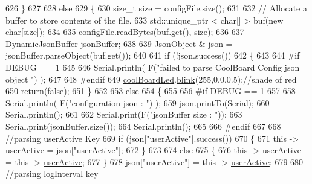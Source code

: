 \begin{DoxyCode}
626     \}
627 
628     \textcolor{keywordflow}{else}
629     \{
630         \textcolor{keywordtype}{size\_t} size = configFile.size();
631 
632         \textcolor{comment}{// Allocate a buffer to store contents of the file.}
633         std::unique\_ptr < char[] > buf(\textcolor{keyword}{new} \textcolor{keywordtype}{char}[size]);
634 
635         configFile.readBytes(buf.get(), size);
636 
637         DynamicJsonBuffer jsonBuffer;
638 
639         JsonObject & json = jsonBuffer.parseObject(buf.get());
640 
641         \textcolor{keywordflow}{if} (!json.success())
642         \{
643         
644 \textcolor{preprocessor}{        #if DEBUG == 1}
645 
646             Serial.println( F(\textcolor{stringliteral}{"failed to parse CoolBoard Config json object "}) );
647     
648 \textcolor{preprocessor}{        #endif}
649             \hyperlink{classCoolBoard_a1b1d3c684a5baa56b08486e192fd8e97}{coolBoardLed}.\hyperlink{classCoolBoardLed_a96e1ea13003eee34c9dbcef340404426}{blink}(255,0,0,0.5);\textcolor{comment}{//shade of red     }
650             \textcolor{keywordflow}{return}(\textcolor{keyword}{false});
651         \}
652 
653         \textcolor{keywordflow}{else}
654         \{   
655         
656 \textcolor{preprocessor}{        #if DEBUG == 1}
657             
658             Serial.println( F(\textcolor{stringliteral}{"configuration json : "}) );
659             json.printTo(Serial);
660             Serial.println();
661             
662             Serial.print(F(\textcolor{stringliteral}{"jsonBuffer size : "}));
663             Serial.print(jsonBuffer.size());
664             Serial.println();
665 
666 \textcolor{preprocessor}{        #endif}
667             
668             \textcolor{comment}{//parsing userActive Key}
669             \textcolor{keywordflow}{if} (json[\textcolor{stringliteral}{"userActive"}].success())
670             \{
671                 \textcolor{keyword}{this} -> \hyperlink{classCoolBoard_a6395459131d6889a3005f79c7a35e964}{userActive} = json[\textcolor{stringliteral}{"userActive"}];
672             \}
673 
674             \textcolor{keywordflow}{else}
675             \{
676                 \textcolor{keyword}{this} -> \hyperlink{classCoolBoard_a6395459131d6889a3005f79c7a35e964}{userActive} = \textcolor{keyword}{this} -> \hyperlink{classCoolBoard_a6395459131d6889a3005f79c7a35e964}{userActive};
677             \}
678             json[\textcolor{stringliteral}{"userActive"}] = \textcolor{keyword}{this} -> \hyperlink{classCoolBoard_a6395459131d6889a3005f79c7a35e964}{userActive};
679 
680             \textcolor{comment}{//parsing logInterval key}

\end{DoxyCode}
